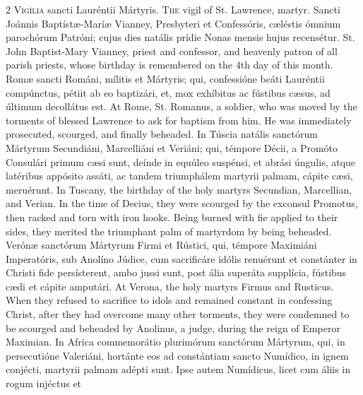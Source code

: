 \begin{paracol}{2}
\lettrine[lines=1]{V}{igília} sancti Lauréntii Mártyris.
\switchcolumn
{}
\lettrine[lines=1]{T}{he} vigil of St. Lawrence, martyr.
\switchcolumn*
{}
Sancti Joánnis 
 Baptístæ-Maríæ Vianney, Presbyteri et Confessóris, cæléstis ómnium 
 parochórum Patróni; cujus dies natális prídie Nonas mensis hujus recensétur.
\switchcolumn
{}
St. John Baptist-Mary Vianney, 
 priest and confessor, and heavenly patron of all parish priests, whose 
 birthday is remembered on the 4th day of this month.
\switchcolumn*
{}
Romæ sancti Románi, 
 mílitis et Mártyris; qui, confessióne beáti Lauréntii compúnctus, pétiit ab 
 eo baptizári, et, mox exhíbitus ac fústibus cæsus, ad últimum decollátus 
 est.
\switchcolumn
{}
At Rome, St. Romanus, a soldier, who 
 was moved by the torments of blessed Lawrence to ask for baptism from him. 
 He was immediately prosecuted, scourged, and finally beheaded.
\switchcolumn*
{}
In Túscia natális 
 sanctórum Mártyrum Secundiáni, Marcelliáni et Veriáni; qui, témpore Décii, a 
 Promóto Consulári primum cæsi sunt, deínde in equúleo suspénsi, et abrási úngulis, atque latéribus appósito assáti, ac tandem triumphálem martyrii 
 palmam, cápite cæsi, meruérunt.
\switchcolumn
{}
In Tuscany, the birthday of the holy 
 martyrs Secundian, Marcellian, and Verian. In the time of Decius, they 
 were scourged by the exconsul Promotus, then racked and torn with iron 
 hooks. Being burned with fie applied to their sides, they merited the 
 triumphant palm of martyrdom by being beheaded.
\switchcolumn*
{}
Verónæ sanctórum 
 Mártyrum Firmi et Rústici, qui, témpore Maximiáni Imperatóris, sub Anolíno 
 Júdice, cum sacrificáre idólis renuérunt et constánter in Christi fide persísterent, ambo jussi sunt, post ália superáta supplícia, fústibus cædi 
 et cápite amputári.
\switchcolumn
{}
At Verona, the holy martyrs Firmus 
 and Rusticus. When they refused to sacrifice to idols and remained 
 constant in confessing Christ, after they had overcome many other torments, 
 they were condemned to be scourged and beheaded by Anolinus, a judge, during 
 the reign of Emperor Maximian.
\switchcolumn*
{}
In Africa commemorátio 
 plurimórum sanctórum Mártyrum, qui, in persecutióne Valeriáni, hortánte eos 
 ad constántiam sancto Numídico, in ignem conjécti, martyrii palmam adépti 
 sunt. Ipse autem Numídicus, licet cum áliis in rogum injéctus et 

\end{paracol}
